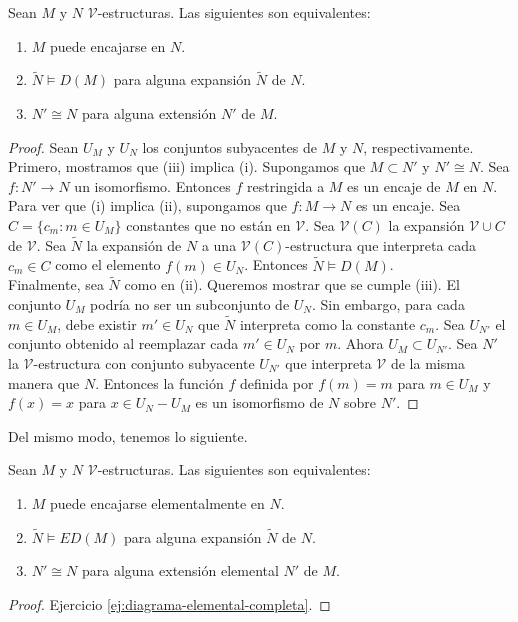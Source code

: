 \documentclass[12pt,a4paper]{book}
\newcommand{\VV}{\mathcal{V}}
\begin{document}
    \begin{proposicion}\label{prop:equivalencia-encaje-diagrama}
        Sean $M$ y $N$ $\VV$-estructuras. Las siguientes son equivalentes:
        \begin{enumerate}
            \item[(i)] $M$ puede encajarse en $N$.
            \item[(ii)] $\widetilde{N}\models D(M)$ para alguna expansión $\widetilde{N}$ de $N$.
            \item[(iii)] $N'\cong N$ para alguna extensión $N'$ de $M$.
        \end{enumerate}
    \end{proposicion}
    \begin{proof}
        Sean $U_{M}$ y $U_{N}$ los conjuntos subyacentes de $M$ y $N$, respectivamente.\\
        Primero, mostramos que (iii) implica (i). Supongamos que $M\subset N'$ y $N'\cong N$. Sea $f:N'\rightarrow N$ un
        isomorfismo. Entonces $f$ restringida a $M$ es un encaje de $M$ en $N$.\\
        Para ver que (i) implica (ii), supongamos que $f:M\rightarrow N$ es un encaje. Sea $C=\{c_{m}:m\in U_{M}\}$
        constantes que no están en $\VV$. Sea $\VV(C)$ la expansión $\VV\cup C$ de $\VV$. Sea $\widetilde{N}$ la expansión
        de $N$ a una $\VV(C)$-estructura que interpreta cada $c_{m}\in C$ como el elemento $f(m)\in U_{N}$. Entonces
        $\widetilde{N}\models D(M)$.\\
        Finalmente, sea $\widetilde{N}$ como en (ii). Queremos mostrar que se cumple (iii). El conjunto $U_{M}$ podría no
        ser un subconjunto de $U_{N}$. Sin embargo, para cada $m\in U_{M}$, debe existir $m'\in U_{N}$ que $\widetilde{N}$
        interpreta como la constante $c_{m}$. Sea $U_{N'}$ el conjunto obtenido al reemplazar cada $m'\in U_{N}$ por $m$.
        Ahora $U_{M}\subset U_{N'}$. Sea $N'$ la $\VV$-estructura con conjunto subyacente $U_{N'}$ que interpreta $\VV$ de
        la misma manera que $N$. Entonces la función $f$ definida por $f(m)=m$ para $m\in U_{M}$ y $f(x)=x$ para
        $x\in U_{N}-U_{M}$ es un isomorfismo de $N$ sobre $N'$.
    \end{proof}

    Del mismo modo, tenemos lo siguiente.

    \begin{proposicion}\label{prop:equivalencia-encaje-elemental-diagrama}
        Sean $M$ y $N$ $\VV$-estructuras. Las siguientes son equivalentes:
        \begin{enumerate}
            \item[(i)] $M$ puede encajarse elementalmente en $N$.
            \item[(ii)] $\widetilde{N}\models ED(M)$ para alguna expansión $\widetilde{N}$ de $N$.
            \item[(iii)] $N'\cong N$ para alguna extensión elemental $N'$ de $M$.
        \end{enumerate}
    \end{proposicion}
    \begin{proof}
        Ejercicio \ref{ej:diagrama-elemental-completa}.
    \end{proof}
\end{document}

